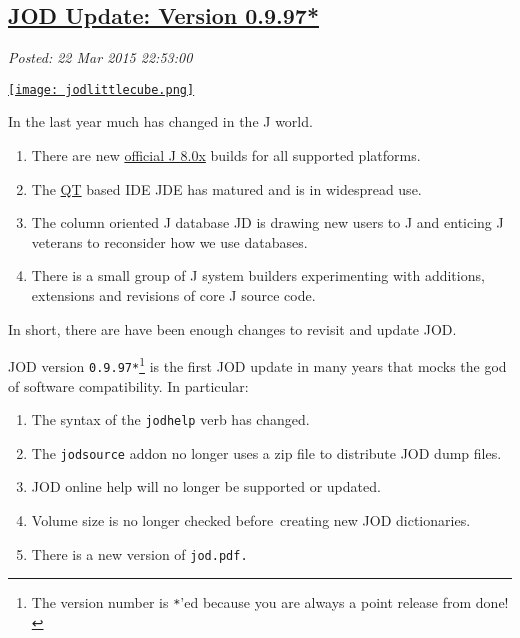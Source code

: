 %

\subsection*{\href{https://bakerjd99.wordpress.com/2015/03/22/jod-update-version-0-9-97/}{JOD Update: Version 0.9.97*}}


\noindent\emph{Posted: 22 Mar 2015 22:53:00}
\vspace{6pt}

\captionsetup[floatingfigure]{labelformat=empty}
\begin{floatingfigure}[r]{0.10\textwidth}
\centering
\href{http://www.jsoftware.com/jwiki/Addons/general/jod}{\texttt{[image: jodlittlecube.png]}}
\label{fig:4946X0}
\end{floatingfigure} In the last year much has changed in the J world.


\begin{enumerate}
\itemsep1pt\parskip0pt
\item
  There are new \href{http://www.jsoftware.com/stable.htm}{official J
  8.0x} builds for all supported platforms.
\item
  The \href{http://www.qt.io/download/}{QT} based IDE JDE has matured
  and is in widespread use.
\item
  The column oriented J database JD is drawing new users to J and
  enticing J veterans to reconsider how we use databases.
\item
  There is a small group of J system builders experimenting with
  additions, extensions and revisions of core J source code.
\end{enumerate}

In short, there are have been enough changes to revisit and update JOD.

JOD version
\texttt{0.9.97*}\footnote{The version number is \texttt{*}'ed because
you are always a point release from done!} is
the first JOD update in many years that mocks the god of software
compatibility. In particular:

\begin{enumerate}
\itemsep1pt\parskip0pt
\item
  The syntax of the \texttt{jodhelp} verb has changed.
\item
  The \texttt{jodsource} addon no longer uses a zip file to distribute
  JOD dump files.
\item
  JOD online help will no longer be supported or updated.
\item
  Volume size is no longer checked before~creating new JOD dictionaries.
\item
  There is a new version of \texttt{jod.pdf.}
\end{enumerate}

